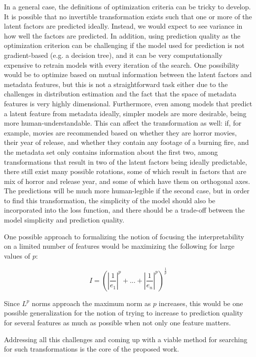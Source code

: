 In a general case, the definitions of optimization criteria can be tricky
to develop. It is possible that no invertible transformation exists such that
one or more of the latent factors are predicted ideally. Instead, we would
expect to see variance in how well the factors are predicted. In addition, using
prediction quality as the optimization criterion can be challenging if the
model used for prediction is not gradient-based (e.g. a decision tree), and it
can be very computationally expensive to retrain models with every iteration of
the search. One possibility would be to optimize based on mutual information
between the latent factors and metadata features, but this is not a
straightforward task either due to the challenges in distribution estimation and
the fact that the space of metadata features is very highly dimensional.
Furthermore, even among models that predict a latent feature from metadata
ideally, simpler models are more desirable, being more human-understandable.
This can affect the transformation as well: if, for example, movies are
recommended based on whether they are horror movies, their year of release, and
whether they contain any footage of a burning fire, and the metadata set only
contains information about the first two, among transformations that result in
two of the latent factors being ideally predictable, there still exist many
possible rotations, some of which result in factors that are mix of horror and
release year, and some of which have them on orthogonal axes. The predictions
will be much more human-legible if the second case, but in order to find this
transformation, the simplicity of the model should also be incorporated into the
loss function, and there should be a trade-off between the model simplicity and
prediction quality.

One possible approach to formalizing the notion of focusing the interpretability
on a limited number of features would be maximizing the following for large
values of $p$:

\begin{equation}
I = (|\frac{1}{e_1}|^p + ... + |\frac{1}{e_n}|^p)^{\frac{1}{p}}
\end{equation}

Since $L^p$
norms approach the maximum norm as $p$ increases, this would be one possible
generalization for the notion of trying to increase to prediction quality for
several features as much as possible when not only one feature matters.

Addressing all this challenges and coming up with a viable method for searching
for such transformations is the core of the proposed work.
